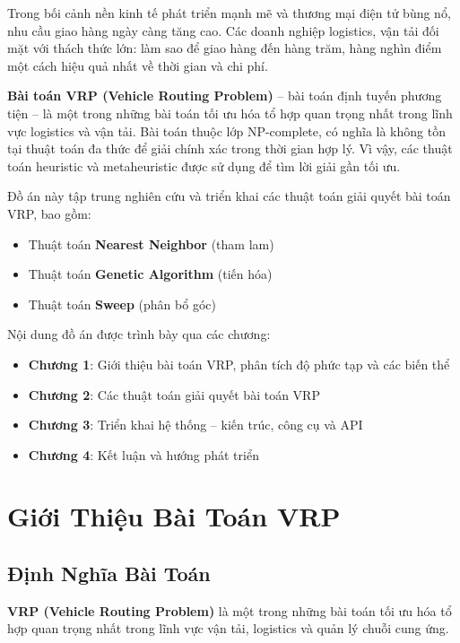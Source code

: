 \documentclass[12pt,a4paper,openany,oneside]{report}
\begin{document}
Trong bối cảnh nền kinh tế phát triển mạnh mẽ và thương mại điện tử bùng nổ, nhu cầu giao hàng ngày càng tăng cao. Các doanh nghiệp logistics, vận tải đối mặt với thách thức lớn: làm sao để giao hàng đến hàng trăm, hàng nghìn điểm một cách hiệu quả nhất về thời gian và chi phí.

\textbf{Bài toán VRP (Vehicle Routing Problem)} -- bài toán định tuyến phương tiện -- là một trong những bài toán tối ưu hóa tổ hợp quan trọng nhất trong lĩnh vực logistics và vận tải. Bài toán thuộc lớp NP-complete, có nghĩa là không tồn tại thuật toán đa thức để giải chính xác trong thời gian hợp lý. Vì vậy, các thuật toán heuristic và metaheuristic được sử dụng để tìm lời giải gần tối ưu.

Đồ án này tập trung nghiên cứu và triển khai các thuật toán giải quyết bài toán VRP, bao gồm:
\begin{itemize}
\item Thuật toán \textbf{Nearest Neighbor} (tham lam)
\item Thuật toán \textbf{Genetic Algorithm} (tiến hóa)
\item Thuật toán \textbf{Sweep} (phân bổ góc)
\end{itemize}

Nội dung đồ án được trình bày qua các chương:
\begin{itemize}
\item \textbf{Chương 1}: Giới thiệu bài toán VRP, phân tích độ phức tạp và các biến thể
\item \textbf{Chương 2}: Các thuật toán giải quyết bài toán VRP
\item \textbf{Chương 3}: Triển khai hệ thống -- kiến trúc, công cụ và API
\item \textbf{Chương 4}: Kết luận và hướng phát triển
\end{itemize}

\chapter{Giới Thiệu Bài Toán VRP}

\section{Định Nghĩa Bài Toán}

\textbf{VRP (Vehicle Routing Problem)} là một trong những bài toán tối ưu hóa tổ hợp quan trọng nhất trong lĩnh vực vận tải, logistics và quản lý chuỗi cung ứng.
\end{document}
